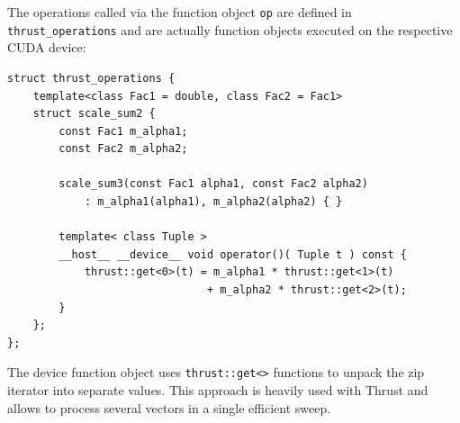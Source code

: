 \documentclass[final]{siamltex}
\newcommand{\code}[1]{\lstinline|#1|}
\begin{document}
The operations called via the function object \code{op} are defined in
\code{thrust_operations} and are actually function objects executed on the
respective CUDA device:
\begin{lstlisting}
struct thrust_operations {
    template<class Fac1 = double, class Fac2 = Fac1>
    struct scale_sum2 {
        const Fac1 m_alpha1;
        const Fac2 m_alpha2;

        scale_sum3(const Fac1 alpha1, const Fac2 alpha2)
            : m_alpha1(alpha1), m_alpha2(alpha2) { }

        template< class Tuple >
        __host__ __device__ void operator()( Tuple t ) const {
            thrust::get<0>(t) = m_alpha1 * thrust::get<1>(t)
                               + m_alpha2 * thrust::get<2>(t);
        }
    };
};
\end{lstlisting}
The device function object uses \code{thrust::get<>} functions to unpack the
zip iterator into separate values.  This approach is heavily used with Thrust
and allows to process several vectors in a single efficient sweep.
\end{document}
